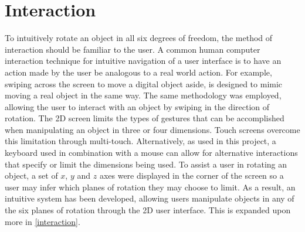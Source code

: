 \documentclass{l4proj}
\begin{document}







\section{Interaction}

To intuitively rotate an object in all six degrees of freedom, the method of interaction should be familiar to the user. 
A common human computer interaction technique for intuitive navigation of a user interface is to have an action made by the user be analogous to a real world action. For example, swiping across the screen to move a digital object aside, is designed to mimic moving a real object in the same way. 
The same methodology was employed, allowing the user to interact with an object by swiping in the direction of rotation. The 2D screen limits the types of gestures that can be accomplished when manipulating an object in three or four dimensions. Touch screens overcome this limitation through multi-touch. Alternatively, as used in this project, a keyboard used in combination with a mouse can allow for alternative interactions that specify or limit the dimensions being used.
To assist a user in rotating an object, a set of $x$, $y$ and $z$ axes were displayed in the corner of the screen so a user may infer which planes of rotation they may choose to limit.
As a result, an intuitive system has been developed, allowing users manipulate objects in any of the six planes of rotation through the 2D user interface. This is expanded upon more in \cref{interaction}.
\end{document}
